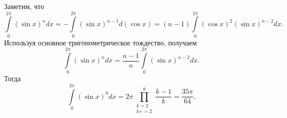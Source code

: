 \documentclass{article}
\begin{document}
Заметим, что
$$\int\limits_0^{2\pi} (\sin x)^n dx = -\int\limits_0^{2\pi} (\sin x)^{n-1} d(\cos x) = (n-1) \int\limits_0^{2\pi} (\cos x)^2 (\sin x)^{n-2} dx.$$
Используя основное тригонометрическое тождество, получаем
$$\int\limits_0^{2\pi} (\sin x)^n dx = \frac{n-1}{n} \int\limits_0^{2\pi} (\sin x)^{n-2} dx.$$
Тогда
$$\int\limits_0^{2\pi} (\sin x)^8 dx = 2\pi \prod_{\substack{k=2\\k+=2}}^8 \frac{k-1}{k} = \frac{35\pi}{64}.$$
\end{document}
